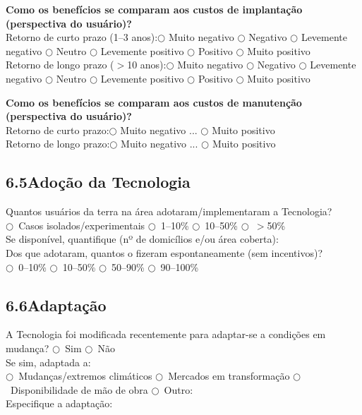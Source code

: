 \textbf{Como os benefícios se comparam aos custos de implantação (perspectiva do usuário)?}\\
Retorno de curto prazo (1--3 anos):\quad $\bigcirc$ Muito negativo \quad $\bigcirc$ Negativo \quad $\bigcirc$ Levemente negativo \quad $\bigcirc$ Neutro \quad $\bigcirc$ Levemente positivo \quad $\bigcirc$ Positivo \quad $\bigcirc$ Muito positivo\\
Retorno de longo prazo ($>$10 anos):\quad $\bigcirc$ Muito negativo \quad $\bigcirc$ Negativo \quad $\bigcirc$ Levemente negativo \quad $\bigcirc$ Neutro \quad $\bigcirc$ Levemente positivo \quad $\bigcirc$ Positivo \quad $\bigcirc$ Muito positivo

\medskip\noindent
\textbf{Como os benefícios se comparam aos custos de manutenção (perspectiva do usuário)?}\\
Retorno de curto prazo:\quad $\bigcirc$ Muito negativo \quad ... \quad $\bigcirc$ Muito positivo\\
Retorno de longo prazo:\quad $\bigcirc$ Muito negativo \quad ... \quad $\bigcirc$ Muito positivo

\subsection{6.5\quad Adoção da Tecnologia}

Quantos usuários da terra na área adotaram/implementaram a Tecnologia?\\
$\bigcirc$~Casos isolados/experimentais \quad $\bigcirc$~1--10\% \quad $\bigcirc$~10--50\% \quad $\bigcirc$~$>$50\%\\[4pt]
Se disponível, quantifique (nº de domicílios e/ou área coberta): \dotfill\\[4pt]
Dos que adotaram, quantos o fizeram espontaneamente (sem incentivos)?\\
$\bigcirc$~0--10\% \quad $\bigcirc$~10--50\% \quad $\bigcirc$~50--90\% \quad $\bigcirc$~90--100\%

\subsection{6.6\quad Adaptação}

A Tecnologia foi modificada recentemente para adaptar-se a condições em mudança? $\bigcirc$~Sim \quad $\bigcirc$~Não\\[4pt]
Se sim, adaptada a:\\
$\bigcirc$~Mudanças/extremos climáticos \quad $\bigcirc$~Mercados em transformação \quad $\bigcirc$~Disponibilidade de mão de obra \quad $\bigcirc$~Outro: \dotfill\\
Especifique a adaptação: \dotfill

